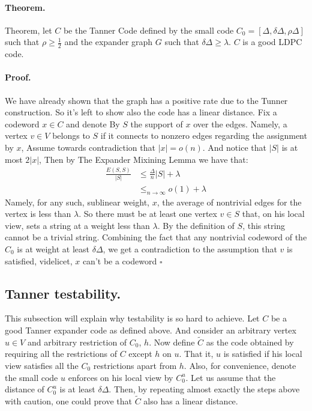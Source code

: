 \documentclass{article}
\begin{document}
\begin{multicols*}{2}
\paragraph{Theorem.} Theorem, let $C$ be the Tanner Code defined by the small code $C_{0} = [\Delta,\delta\Delta, \rho\Delta ]$ such that $\rho \ge \frac{1}{2}$ and the expander graph $G$ such that $\delta\Delta \ge \lambda$. $C$ is a good  LDPC code.
\paragraph{Proof.} We have already shown that the graph has a positive rate due to the Tunner construction. So it's left to show also the code has a linear distance. Fix a codeword $x \in C$ and denote By $S$ the support of $x$ over the edges. Namely, a vertex $v\in V$ belongs to $S$ if it connects to nonzero edges regarding the assignment by $x$, Assume towards contradiction that $|x| = o\left( n \right)$. And notice that $|S|$ is at most $2|x|$, Then by The Expander Mixining Lemma we have that: 
\begin{equation*}
  \begin{split}
    \frac{E\left( S,S \right)}{|S|} & \le \frac{\Delta}{n}|S|  + \lambda \\
    & \le_{ n \rightarrow \infty} o\left( 1 \right) + \lambda
  \end{split}
\end{equation*}
Namely, for any such, sublinear weight, $x$, the average of nontrivial edges for the vertex is less than $\lambda$. So there must be at least one vertex $v \in S$ that, on his local view, sets a  string at a weight less than $\lambda$. By the definition of $S$, this string cannot be a trivial string. Combining the fact that any nontrivial codeword of the $C_{0}$ is at weight at least $\delta\Delta$, we get a contradiction to the assumption that $v$ is satisfied, videlicet, $x$ can't be a codeword $\square$
\subsection{Tanner testability.} This subsection will explain why testability is so hard to achieve. Let $C$ be a good Tanner expander code as defined above. And consider an arbitrary vertex $u \in V$ and arbitrary restriction of $C_{0}$, $h$. Now define $\tilde{C}$ as the code obtained by requiring all the restrictions of $C$ except $h$ on $u$. That it, $u$ is satisfied if his local view satisfies all the $C_{0}$ restrictions apart from $h$.
Also, for convenience, denote the small code $u$ enforces on his local view by $C_{0}^{u}$. Let us assume that the distance of $C_{0}^{u}$ is at least $\delta\Delta$. 
Then, by repeating almost exactly the steps above with caution, one could prove that $\tilde{C}$ also has a linear distance. 



\end{multicols*}
\end{document}
